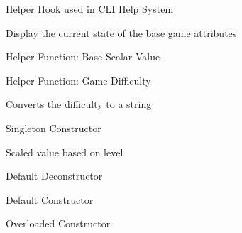 \begin{DoxyRefList}
%
Helper Hook used in CLI Help System  
\item[Member \mbox{\hyperlink{classBalanceController_a13eb2d765e0aa528b131b32dd1940fac}{Balance\+Controller\+::display\+\_\+state}} ()]\label{todo__todo000023}%
%
Display the current state of the base game attributes  
\item[Member \mbox{\hyperlink{classBalanceController_a68f4371ae68f48c5040906949cab77b4}{Balance\+Controller\+::get\+\_\+base}} ()]\label{todo__todo000024}%
%
Helper Function\+: Base Scalar Value  
\item[Member \mbox{\hyperlink{classBalanceController_ab533d0f17d9e616c208049dc318a9dc8}{Balance\+Controller\+::get\+\_\+difficulty}} ()]\label{todo__todo000025}%
%
Helper Function\+: Game Difficulty  
\item[Member \mbox{\hyperlink{classBalanceController_a882a510066a59049b37bacd83a303267}{Balance\+Controller\+::get\+\_\+difficulty\+\_\+str}} ()]\label{todo__todo000026}%
%
Converts the difficulty to a string  
\item[Member \mbox{\hyperlink{classBalanceController_a570c607b223a0a9c033603e833458251}{Balance\+Controller\+::Get\+Instance}} ()]\label{todo__todo000021}%
%
Singleton Constructor  
\item[Member \mbox{\hyperlink{classBalanceController_a89402d9a7abd85a4fa522f3ad642b6ce}{Balance\+Controller\+::scalar}} (int)]\label{todo__todo000022}%
%
Scaled value based on level  
\item[Member \mbox{\hyperlink{classBalanceController_a59d36764e3b3c8121577eb9d699a2d49}{Balance\+Controller\+::$\sim$\+Balance\+Controller}} ()]\label{todo__todo000028}%
%
Default Deconstructor  
\item[Member \mbox{\hyperlink{classBaseCase_a3a66491e633d93e6fbdca84f9189fb8d}{Base\+Case\+::Base\+Case}} ()]\label{todo__todo000187}%
%
Default Constructor  
\item[Member \mbox{\hyperlink{classBaseCase_a5c6f38a1e76f7fbbb6c8ef129082f0da}{Base\+Case\+::Base\+Case}} (const char $\ast$)]\label{todo__todo000188}%
%
Overloaded Constructor  
\item[Member \mbox{\hyperlink{classBaseCase_acb6a604a3bfe207cc03b3ccb6a550af2}{Base\+Case\+::$\sim$\+Base\+Case}} ()]\label{todo__todo000189}%

\end{DoxyRefList}
